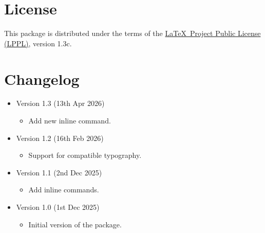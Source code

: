 \section{License}
This package is distributed under the terms of the
\href{https://www.latex-project.org/lppl/}{\LaTeX\ Project Public License (LPPL)}, version 1.3c.



\section{Changelog}
\begin{itemize}
    \item Version 1.3 (13th Apr 2026)
    \begin{itemize}
        \item Add new \UVL inline command.
    \end{itemize}
    \item Version 1.2 (16th Feb 2026)
    \begin{itemize}
        \item Support for compatible typography.
    \end{itemize}
    \item Version 1.1 (2nd Dec 2025)
    \begin{itemize}
        \item Add inline commands.
    \end{itemize}
    \item Version 1.0 (1st Dec 2025)
    \begin{itemize}
        \item Initial version of the package.
    \end{itemize}
\end{itemize}

 




